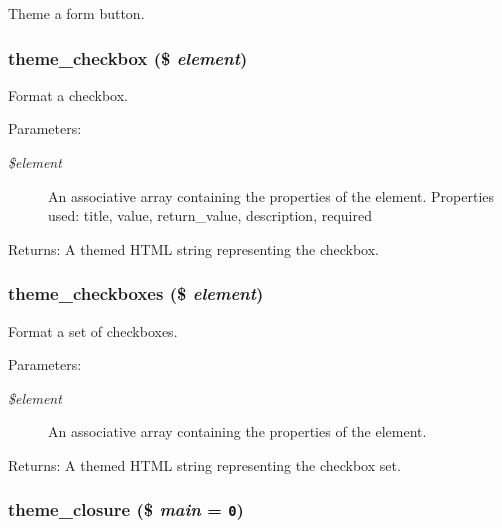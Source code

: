 Theme a form button. \hypertarget{group__themeable_g70f81ff11154f10ca50ad429a9e29cd6}{
\subsubsection[{theme\_\-checkbox}]{\setlength{\rightskip}{0pt plus 5cm}theme\_\-checkbox (\$ {\em element})}}
\label{group__themeable_g70f81ff11154f10ca50ad429a9e29cd6}


Format a checkbox.

\begin{Desc}
\item[Parameters:]
\begin{description}
\item[{\em \$element}]An associative array containing the properties of the element. Properties used: title, value, return\_\-value, description, required \end{description}
\end{Desc}
\begin{Desc}
\item[Returns:]A themed HTML string representing the checkbox. \end{Desc}
\hypertarget{group__themeable_ga4d5e2072b3b90ff9f09424e34dfae02}{
\subsubsection[{theme\_\-checkboxes}]{\setlength{\rightskip}{0pt plus 5cm}theme\_\-checkboxes (\$ {\em element})}}
\label{group__themeable_ga4d5e2072b3b90ff9f09424e34dfae02}


Format a set of checkboxes.

\begin{Desc}
\item[Parameters:]
\begin{description}
\item[{\em \$element}]An associative array containing the properties of the element. \end{description}
\end{Desc}
\begin{Desc}
\item[Returns:]A themed HTML string representing the checkbox set. \end{Desc}
\hypertarget{group__themeable_gfc75590efceee02ad1c120d060d628ae}{
\subsubsection[{theme\_\-closure}]{\setlength{\rightskip}{0pt plus 5cm}theme\_\-closure (\$ {\em main} = {\tt 0})}}
\label{group__themeable_gfc75590efceee02ad1c120d060d628ae}


